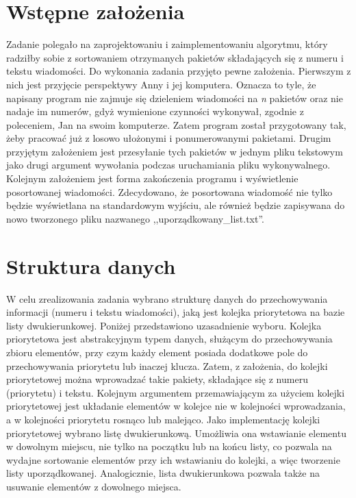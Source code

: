 \documentclass[12pt]{article}
\begin{document}
    


\section{Wstępne założenia}
Zadanie polegało na zaprojektowaniu i zaimplementowaniu algorytmu, który radziłby sobie z sortowaniem otrzymanych 
pakietów składających się z numeru i tekstu wiadomości. Do wykonania zadania przyjęto pewne założenia. 
Pierwszym z nich jest przyjęcie perspektywy Anny i jej komputera. Oznacza to tyle, że napisany program nie zajmuje się 
dzieleniem wiadomości na \textit{n} pakietów oraz nie nadaje im numerów, gdyż wymienione czynności wykonywał,
zgodnie z poleceniem, Jan na swoim komputerze. Zatem program został przygotowany tak, żeby pracować już z 
losowo ułożonymi i ponumerowanymi pakietami. Drugim przyjętym założeniem jest przesyłanie tych pakietów w jednym 
pliku tekstowym jako drugi argument wywołania podczas uruchamiania pliku wykonywalnego. Kolejnym założeniem jest
forma zakończenia programu i wyświetlenie posortowanej wiadomości. Zdecydowano, że posortowana wiadomość
nie tylko będzie wyświetlana na standardowym wyjściu, ale również będzie zapisywana do nowo 
tworzonego pliku nazwanego ,,uporządkowany\_list.txt''. 

\section{Struktura danych}
W celu zrealizowania zadania wybrano strukturę danych do przechowywania informacji (numeru i tekstu wiadomości), 
jaką jest kolejka priorytetowa na bazie listy dwukierunkowej. Poniżej przedstawiono uzasadnienie wyboru.
Kolejka priorytetowa jest abstrakcyjnym typem danych, służącym do przechowywania 
zbioru elementów, przy czym każdy element posiada dodatkowe pole do przechowywania priorytetu lub inaczej 
klucza. Zatem, z założenia, do kolejki priorytetowej można wprowadzać takie pakiety, składające się 
z numeru (priorytetu) i tekstu. Kolejnym argumentem przemawiającym za użyciem kolejki priorytetowej 
jest układanie elementów w kolejce nie w kolejności wprowadzania, a w kolejności priorytetu rosnąco lub malejąco.
Jako implementację kolejki priorytetowej wybrano listę dwukierunkową. Umożliwia ona wstawianie elementu 
w dowolnym miejscu, nie tylko na początku lub na końcu listy, co pozwala na wydajne sortowanie elementów przy ich 
wstawianiu do kolejki, a więc tworzenie listy uporządkowanej. Analogicznie, lista dwukierunkowa pozwala także na 
usuwanie elementów z dowolnego miejsca.
\end{document}
